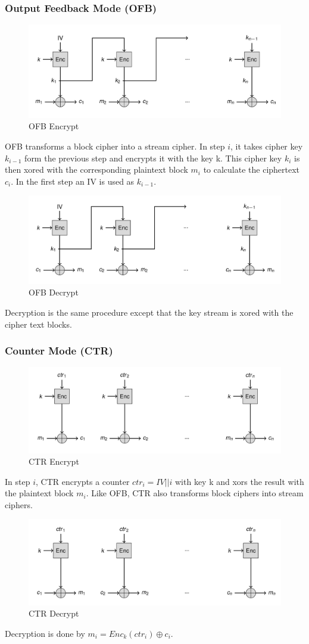 \subsubsection{Output Feedback Mode (OFB)}
\begin{figure}[H]
  \centering
  \includegraphics[width=.8\textwidth]{figures/ofb_encrypt.png}
  \caption{OFB Encrypt}
\end{figure}
OFB transforms a block cipher into a stream cipher.
In step $i$, it takes cipher key $k_{i-1}$ form the previous step and encrypts it with the key k.
This cipher key $k_i$ is then xored with the corresponding plaintext block $m_i$ to calculate the ciphertext $c_i$.
In the first step an IV is used as $k_{i-1}$.

\begin{figure}[H]
  \centering
  \includegraphics[width=.8\textwidth]{figures/ofb_decrypt}
  \caption{OFB Decrypt}
\end{figure}
Decryption is the same procedure except that the key stream is xored with the cipher text blocks.
\newpage

\subsubsection{Counter Mode (CTR)}
\begin{figure}[H]
  \centering
  \includegraphics[width=.8\textwidth]{figures/ctr_encrypt}
  \caption{CTR Encrypt}
\end{figure}
In step $i$, CTR encrypts a counter $ctr_i = IV || i$ with key k and xors the result with the plaintext block $m_i$.
Like OFB, CTR also transforms block ciphers into stream ciphers.

\begin{figure}[H]
  \centering
  \includegraphics[width=.8\textwidth]{figures/ctr_decrypt.png}
  \caption{CTR Decrypt}
\end{figure}
Decryption is done by $m_i = Enc_k(ctr_i) \oplus c_i$.
